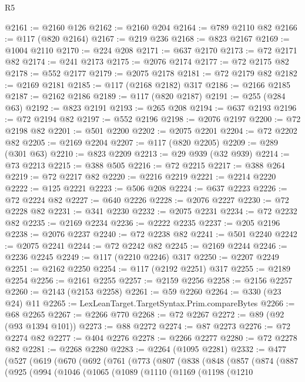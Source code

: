 \begin{lexlean}{R5}
\begin{coremodule}
@2161 := @2160 @126
@2162 := @2160 @204
@2164 := @789 @2110 @82
@2166 := @117 (@820 @2164)
@2167 := @219 @236
@2168 := @823 @2167
@2169 := @1004 @2110
@2170 := @224 @208
@2171 := @637 @2170
@2173 := @72 @2171 @82
@2174 := @241 @2173
@2175 := @2076 @2174
@2177 := @72 @2175 @82
@2178 := @552 @2177
@2179 := @2075 @2178
@2181 := @72 @2179 @82
@2182 := @2169 @2181
@2185 := @117 (@2168 @2182) @317
@2186 := @2166 @2185
@2187 := @2162 @2186
@2189 := @117 (@820 @2187)
@2191 := @255 (@284 @63)
@2192 := @823 @2191
@2193 := @265 @208
@2194 := @637 @2193
@2196 := @72 @2194 @82
@2197 := @552 @2196
@2198 := @2076 @2197
@2200 := @72 @2198 @82
@2201 := @501 @2200
@2202 := @2075 @2201
@2204 := @72 @2202 @82
@2205 := @2169 @2204
@2207 := @117 (@820 @2205)
@2209 := @289 (@301 @63)
@2210 := @823 @2209
@2213 := @29 @939 (@32 @939)
@2214 := @73 @2213
@2215 := @388 @505
@2216 := @72 @2215
@2217 := @388 @264
@2219 := @72 @2217 @82
@2220 := @2216 @2219
@2221 := @2214 @2220
@2222 := @125 @2221
@2223 := @506 @208
@2224 := @637 @2223
@2226 := @72 @2224 @82
@2227 := @640 @2226
@2228 := @2076 @2227
@2230 := @72 @2228 @82
@2231 := @341 @2230
@2232 := @2075 @2231
@2234 := @72 @2232 @82
@2235 := @2169 @2234
@2236 := @2222 @2235
@2237 := @205 @2196
@2238 := @2076 @2237
@2240 := @72 @2238 @82
@2241 := @501 @2240
@2242 := @2075 @2241
@2244 := @72 @2242 @82
@2245 := @2169 @2244
@2246 := @2236 @2245
@2249 := @117 (@2210 @2246) @317
@2250 := @2207 @2249
@2251 := @2162 @2250
@2254 := @117 (@2192 @2251) @317
@2255 := @2189 @2254
@2256 := @2161 @2255
@2257 := @2159 @2256
@2258 := @2156 @2257
@2260 := @2143 (@2153 @2258)
@2261 := @59 @2260
@2264 := @330 (@23 @24) @11
@2265 := LexLeanTarget.TargetSyntax.Prim.compareBytes
@2266 := @68 @2265
@2267 := @2266 @770
@2268 := @72 @2267
@2272 := @89 (@92 (@93 @1394 @101))
@2273 := @88 @2272
@2274 := @87 @2273
@2276 := @72 @2274 @82
@2277 := @404 @2276
@2278 := @2266 @2277
@2280 := @72 @2278 @82
@2281 := @2268 @2280
@2283 := @2264 (@1095 @2281)
@2332 := @477
    (@527
      (@619
        (@670
          (@692
            (@761
              (@773
                (@807
                  (@838
                    (@848
                      (@857
                        (@874
                          (@887
                            (@925
                              (@994
                                (@1046
                                  (@1065
                                    (@1089
                                      (@1110
                                        (@1169
                                          (@1198
                                            (@1210

\end{coremodule}
\end{lexlean}
